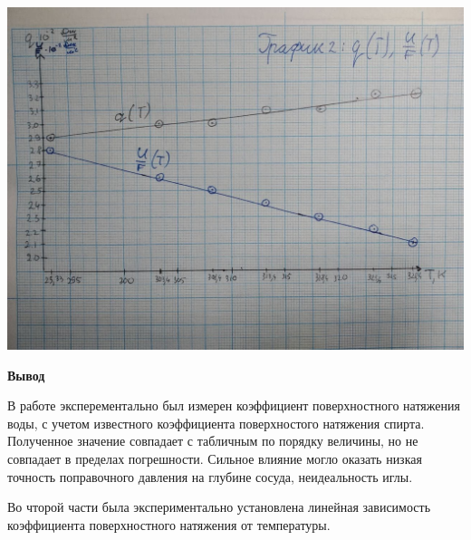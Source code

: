 \documentclass[a4paper,12pt]{article} %
\begin{document}
\includegraphics[width=1\textwidth]{2.jpg}

\newpage

\begin{center}
	\large{\textbf{Вывод}}
\end{center}

В работе эксперементально был измерен коэффициент поверхностного натяжения воды, с учетом известного коэффициента поверхностого натяжения спирта. Полученное значение совпадает с табличным по порядку величины, но не совпадает в пределах погрешности. Сильное влияние могло оказать низкая точность поправочного давления на глубине сосуда, неидеальность иглы.

Во чторой части была экспериментально установлена линейная зависимость коэффициента поверхностного натяжения от температуры.



 













 
\end{document}
